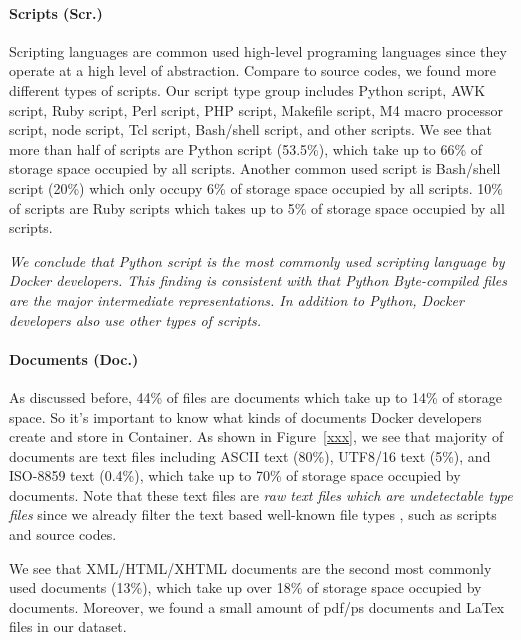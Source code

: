 \paragraph{Scripts (Scr.)}
Scripting languages are common used high-level programing languages since they operate at a high level of abstraction. Compare to source codes, we found more different types of scripts. 
Our script type group includes Python script, AWK script, Ruby script, Perl script, PHP script, Makefile script, M4 macro processor script, node script, Tcl script, Bash/shell script, and other scripts.
We see that more than half of scripts are Python script (53.5\%), which take up to 66\% of storage space occupied by all scripts. Another common used script is Bash/shell script (20\%) which only occupy 6\% of storage space occupied by all scripts. 10\% of scripts are Ruby scripts which takes up to 5\% of storage space occupied by all scripts. %

\textit{We conclude that Python script is the most commonly used scripting language by Docker developers. This finding is consistent with that Python Byte-compiled files are the major intermediate representations.
	In addition to Python, Docker developers also use other types of scripts.}

\paragraph{Documents (Doc.)}
As discussed before, 44\% of files are documents which take up to 14\% of storage space. So it's important to know what kinds of documents Docker developers create and store in Container. 
As shown in Figure~\ref{xxx}, we see that majority of documents are text files including ASCII text (80\%), UTF8/16 text (5\%), and ISO-8859 text (0.4\%), which take up to 70\% of storage space occupied by documents. Note that these text files are \textit{raw text files which are undetectable type files} since we already filter the text based well-known file types%
, such as scripts and source codes.

We see that XML/HTML/XHTML documents are the second most commonly used documents (13\%), which take up over 18\% of storage space occupied by documents. Moreover, we found a small amount of pdf/ps documents and LaTex files in our dataset.%

